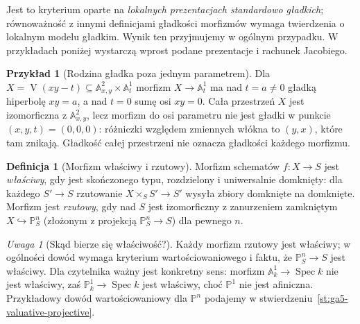 \documentclass[11pt,a4paper,openany]{report}
\numberwithin{equation}{section}
\theoremstyle{plain}
\theoremstyle{definition}
\newtheorem{definicja}[twierdzenie]{Definicja}
\newtheorem{przyklad}[twierdzenie]{Przykład}
\theoremstyle{remark}
\newtheorem{uwaga}[twierdzenie]{Uwaga}
\newcommand{\A}{\mathbb A}
\newcommand{\PP}{\mathbb P}
\newcommand{\V}{\operatorname V}
\newcommand{\Spec}{\operatorname{Spec}}
\begin{document}
Jest to kryterium oparte na \emph{lokalnych prezentacjach
standardowo gładkich}; równoważność z innymi definicjami gładkości
morfizmów wymaga twierdzenia o lokalnym modelu gładkim.
Wynik ten przyjmujemy w ogólnym przypadku. W przykładach poniżej
wystarczą wprost podane prezentacje i rachunek Jacobiego.

\begin{przyklad}[Rodzina gładka poza jednym parametrem]
Dla $X=\V(xy-t)\subseteq\A^2_{x,y}\times\A^1_t$
morfizm $X\to\A^1_t$ ma nad $t=a\ne0$ gładką hiperbolę
$xy=a$, a nad $t=0$ sumę osi $xy=0$. Cała przestrzeń $X$
jest izomorficzna z $\A^2_{x,y}$, lecz morfizm do osi parametru
nie jest gładki w punkcie $(x,y,t)=(0,0,0)$: różniczki
względem zmiennych włókna to $(y,x)$, które tam znikają.
Gładkość całej przestrzeni nie oznacza gładkości każdego morfizmu.
\end{przyklad}

\begin{definicja}[Morfizm właściwy i rzutowy]
\label{def:ga5-proper}
Morfizm schematów $f:X\to S$ jest \emph{właściwy}, gdy jest
skończonego typu, rozdzielony i uniwersalnie domknięty:
dla każdego $S'\to S$ rzutowanie
$X\times_S S'\to S'$ wysyła zbiory domknięte na domknięte.
Morfizm jest \emph{rzutowy}, gdy nad $S$ jest izomorficzny
z zanurzeniem zamkniętym $X\hookrightarrow\PP^n_S$
(złożonym z projekcją $\PP^n_S\to S$) dla pewnego $n$.
\end{definicja}

\begin{uwaga}[Skąd bierze się właściwość?]
Każdy morfizm rzutowy jest właściwy; w ogólności dowód wymaga
kryterium wartościowaniowego i faktu, że $\PP^n_S\to S$ jest
właściwy. Dla czytelnika ważny jest konkretny sens:
morfizm $\A^1_k\to\Spec k$ nie jest właściwy, zaś
$\PP^1_k\to\Spec k$ jest właściwy, choć $\PP^1$ nie jest
afiniczna. Przykładowy dowód wartościowaniowy dla
$\PP^n$ podajemy w stwierdzeniu~\ref{st:ga5-valuative-projective}.
\end{uwaga}
\end{document}
